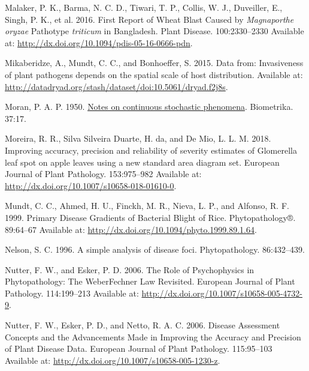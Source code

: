 \documentclass[
  letterpaper,
]{book}
\newlength{\cslhangindent}
\newlength{\cslentryspacingunit} %
\newenvironment{CSLReferences}[2] %
 {%
  \setlength{\parindent}{0pt}
  \ifodd #1
  \let\oldpar\par
  \def\par{\hangindent=\cslhangindent\oldpar}
  \fi
  \setlength{\parskip}{#2\cslentryspacingunit}
 }%
 {}
\begin{document}
\begin{CSLReferences}{0}{0}
\leavevmode{}%
Malaker, P. K., Barma, N. C. D., Tiwari, T. P., Collis, W. J.,
Duveiller, E., Singh, P. K., et al. 2016. First Report of Wheat Blast
Caused by {\emph{Magnaporthe oryzae}} Pathotype {\emph{triticum}} in
Bangladesh. Plant Disease. 100:2330--2330 Available at:
\url{http://dx.doi.org/10.1094/pdis-05-16-0666-pdn}.

\leavevmode{}%
Mikaberidze, A., Mundt, C. C., and Bonhoeffer, S. 2015. Data from:
Invasiveness of plant pathogens depends on the spatial scale of host
distribution. Available at:
\url{http://datadryad.org/stash/dataset/doi:10.5061/dryad.f2j8s}.

\leavevmode{}%
Moran, P. A. P. 1950. \href{https://doi.org/10.2307/2332142}{Notes on
continuous stochastic phenomena}. Biometrika. 37:17.

\leavevmode{}%
Moreira, R. R., Silva Silveira Duarte, H. da, and De Mio, L. L. M. 2018.
Improving accuracy, precision and reliability of severity estimates of
Glomerella leaf spot on apple leaves using a new standard area diagram
set. European Journal of Plant Pathology. 153:975--982 Available at:
\url{http://dx.doi.org/10.1007/s10658-018-01610-0}.

\leavevmode{}%
Mundt, C. C., Ahmed, H. U., Finckh, M. R., Nieva, L. P., and Alfonso, R.
F. 1999. Primary Disease Gradients of Bacterial Blight of Rice.
Phytopathology®. 89:64--67 Available at:
\url{http://dx.doi.org/10.1094/phyto.1999.89.1.64}.

\leavevmode{}%
Nelson, S. C. 1996. A simple analysis of disease foci. Phytopathology.
86:432--439.

\leavevmode{}%
Nutter, F. W., and Esker, P. D. 2006. The Role of Psychophysics in
Phytopathology: The Weber{\textendash}Fechner Law Revisited. European
Journal of Plant Pathology. 114:199--213 Available at:
\url{http://dx.doi.org/10.1007/s10658-005-4732-9}.

\leavevmode{}%
Nutter, F. W., Esker, P. D., and Netto, R. A. C. 2006. Disease
Assessment Concepts and the Advancements Made in Improving the Accuracy
and Precision of Plant Disease Data. European Journal of Plant
Pathology. 115:95--103 Available at:
\url{http://dx.doi.org/10.1007/s10658-005-1230-z}.


\end{CSLReferences}
\end{document}

